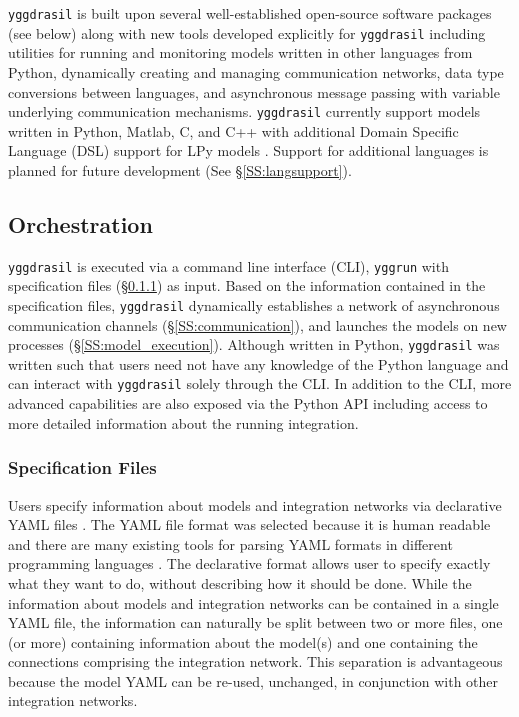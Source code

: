 \documentclass[journal]{IEEEtran}
\newcommand{\pkg}{{\tt yggdrasil}{}}
\newcommand{\pkgrun}{{\tt yggrun}}
\begin{document}
{\pkg} is built upon several well-established open-source software packages (see below) along with new tools developed explicitly for {\pkg} including utilities for running and monitoring models written in other languages from Python, dynamically creating and managing communication networks, data type conversions between languages, and asynchronous message passing with variable underlying communication mechanisms. {\pkg} currently support models written in Python, Matlab, C, and C++ with additional Domain Specific Language (DSL) support for LPy models \citep{Boudon2012}. Support for additional languages is planned for future development (See \S\ref{SS:langsupport}).

\subsection{Orchestration}\label{SS:orchestration}
%
{\pkg} is executed via a command line interface (CLI), {\pkgrun} with specification files (\S\ref{SSS:yaml}) as input. Based on the information contained in the specification files, {\pkg} dynamically establishes a network of asynchronous communication channels (\S\ref{SS:communication}), and launches the models on new processes (\S\ref{SS:model_execution}). Although written in Python, {\pkg} was written such that users need not have any knowledge of the Python language and can interact with {\pkg} solely through the CLI. In addition to the CLI, more advanced capabilities are also exposed via the Python API including access to more detailed information about the running integration.

\subsubsection{Specification Files}\label{SSS:yaml}
%
Users specify information about models and integration networks via declarative YAML files \citep{Ben-Kiki2009}. The YAML file format was selected because it is human readable and there are many existing tools for parsing YAML formats in different programming languages \citep[e.g.][]{Simonov2006,pyyaml,jsyaml}. The declarative format allows user to specify exactly what they want to do, without describing how it should be done. While the information about models and integration networks can be contained in a single YAML file, the information can naturally be split between two or more files, one (or more) containing information about the model(s) and one containing the connections comprising the integration network. This separation is advantageous because the model YAML can be re-used, unchanged, in conjunction with other integration networks. 
\end{document}
